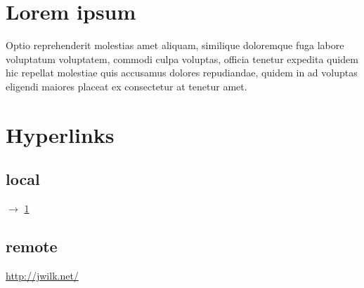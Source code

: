 \documentclass[12pt]{article}
\begin{document}
\section{Lorem ipsum}

\label{lorem-ipsum}

Optio reprehenderit molestias amet aliquam, similique doloremque fuga labore
voluptatum voluptatem, commodi culpa voluptas, officia tenetur expedita quidem
hic repellat molestiae quis accusamus dolores repudiandae, quidem in ad
voluptas eligendi maiores placeat ex consectetur at tenetur amet.

\newpage

\section{Hyperlinks}

\subsection{local}

$\to$ \ref{lorem-ipsum}

\subsection{remote}

\url{http://jwilk.net/}
\end{document}
